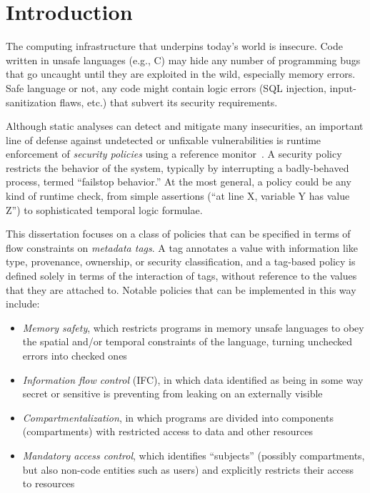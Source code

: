 \documentclass{report}
\begin{document}
\chapter{Introduction}

The computing infrastructure that underpins today's world is insecure. Code written
in unsafe languages (e.g., C) may hide any number of programming bugs that go uncaught
until they are exploited in the wild, especially memory errors. Safe language or not, any code
might contain logic errors (SQL injection, input-sanitization flaws, etc.) that subvert
its security requirements.

Although static analyses can detect and mitigate many insecurities, an important line of
defense against undetected or unfixable vulnerabilities is runtime enforcement of
{\em security policies} using a reference monitor~\cite{Anderson72:PlanningStudy}.
A security policy restricts the behavior of the system, typically by interrupting
a badly-behaved process, termed ``failstop behavior.'' At the most general, a policy could be
any kind of runtime check, from simple assertions (``at line X, variable Y has value Z'') to
sophisticated temporal logic formulae.

This dissertation focuses on a class of policies that can be specified in terms of flow constraints
on \emph{metadata tags}. A tag annotates a value with information like type, provenance,
ownership, or security classification, and a tag-based policy is defined solely in terms of
the interaction of tags, without reference to the values that they are attached to.
Notable policies that can be implemented in this way include:

\begin{itemize}
\item {\em Memory safety}, which restricts programs in memory unsafe languages to obey
  the spatial and/or temporal constraints of the language, turning unchecked errors into
  checked ones
\item {\em Information flow control} (IFC), in which data identified as being in some way secret
  or sensitive is preventing from leaking on an externally visible
\item {\em Compartmentalization}, in which programs are divided into components (compartments)
  with restricted access to data and other resources
\item {\em Mandatory access control}, which identifies ``subjects'' (possibly compartments,
  but also non-code entities such as users) and explicitly restricts their access to resources
\end{itemize}
\end{document}
